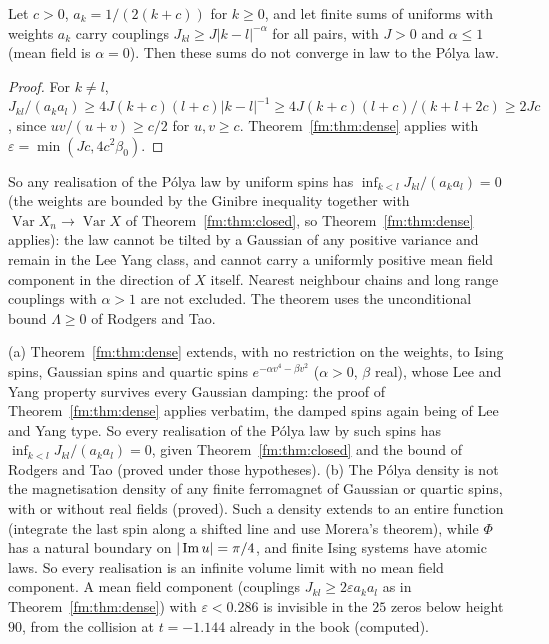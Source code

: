 \begin{corollary}[proved]\label{fm:cor:longrange}
Let $c>0$, $a_k=1/(2(k+c))$ for $k\ge0$, and let finite sums of uniforms with weights $a_k$ carry couplings $J_{kl}\ge J|k-l|^{-\alpha}$ for all pairs, with $J>0$ and $\alpha\le1$ (mean field is $\alpha=0$). Then these sums do not converge in law to the P\'olya law.
\end{corollary}

\begin{proof}
For $k\ne l$, $J_{kl}/(a_ka_l)\ge4J(k+c)(l+c)|k-l|^{-1}\ge4J(k+c)(l+c)/(k+l+2c)\ge2Jc$, since $uv/(u+v)\ge c/2$ for $u,v\ge c$. Theorem~\ref{fm:thm:dense} applies with $\varepsilon=\min(Jc,4c^2\beta_0)$.
\end{proof}

So any realisation of the P\'olya law by uniform spins has $\inf_{k<l}J_{kl}/(a_ka_l)=0$ (the weights are bounded by the Ginibre inequality together with $\operatorname{Var}X_n\to\operatorname{Var}X$ of Theorem~\ref{fm:thm:closed}, so Theorem~\ref{fm:thm:dense} applies): the law cannot be tilted by a Gaussian of any positive variance and remain in the Lee Yang class, and cannot carry a uniformly positive mean field component in the direction of $X$ itself. Nearest neighbour chains and long range couplings with $\alpha>1$ are not excluded. The theorem uses the unconditional bound $\Lambda\ge0$ of Rodgers and Tao.

\begin{remark}\label{fm:rem:realisations}
(a) Theorem~\ref{fm:thm:dense} extends, with no restriction on the weights, to Ising spins, Gaussian spins and quartic spins $e^{-\alpha v^4-\beta v^2}$ ($\alpha>0$, $\beta$ real), whose Lee and Yang property survives every Gaussian damping: the proof of Theorem~\ref{fm:thm:dense} applies verbatim, the damped spins again being of Lee and Yang type. So every realisation of the P\'olya law by such spins has $\inf_{k<l}J_{kl}/(a_ka_l)=0$, given Theorem~\ref{fm:thm:closed} and the bound of Rodgers and Tao (proved under those hypotheses). (b) The P\'olya density is not the magnetisation density of any finite ferromagnet of Gaussian or quartic spins, with or without real fields (proved). Such a density extends to an entire function (integrate the last spin along a shifted line and use Morera's theorem), while $\Phi$ has a natural boundary on $|\operatorname{Im} u|=\pi/4$, and finite Ising systems have atomic laws. So every realisation is an infinite volume limit with no mean field component. A mean field component (couplings $J_{kl}\ge2\varepsilon a_ka_l$ as in Theorem~\ref{fm:thm:dense}) with $\varepsilon<0.286$ is invisible in the $25$ zeros below height $90$, from the collision at $t=-1.144$ already in the book (computed).
\end{remark}

